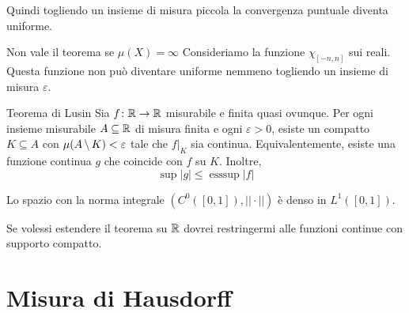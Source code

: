 \documentclass[a4paper]{article}
\begin{document}
\begin{radioactive}
Quindi togliendo un insieme di misura piccola la convergenza puntuale diventa uniforme.
\end{radioactive}

\begin{radioactive}
\begin{snippetexample}{Non vale il teorema se \(\mu(X) = \infty\)}
    Consideriamo la funzione \(\chi_{[-n,n]}\) sui reali.
    Questa funzione non può diventare uniforme nemmeno togliendo un insieme di misura \(\varepsilon\).
\end{snippetexample}
\end{radioactive}

\begin{radioactive}
\begin{snippettheorem}{Teorema di Lusin}
    Sia \(f\colon\mathbb{R}\to\mathbb{R}\) misurabile e finita quasi ovunque.
    Per ogni insieme misurabile \(A\subseteq\mathbb{R}\) di misura finita e ogni \(\varepsilon>0\),
    esiste un compatto \(K\subseteq A\) con \(\mu(A\,\backslash\, K)<\varepsilon\) tale che
    \(f|_K\) sia continua. Equivalentemente, esiste una funzione continua \(g\) che coincide con \(f\)
    su \(K\).
    Inoltre, \[
        \sup|g| \leq \operatorname{ess sup}|f|
    \]
\end{snippettheorem}
\end{radioactive}

\begin{radioactive}
\begin{snippetcorollary}{}
    Lo spazio con la norma integrale \((C^0([0,1]), ||\cdot||)\) è denso in
    \(L^1([0,1])\).
\end{snippetcorollary}
\end{radioactive}

\begin{radioactive}
Se volessi estendere il teorema su \(\mathbb{R}\) dovrei restringermi
alle funzioni continue con supporto compatto.
\end{radioactive}

\section{Misura di Hausdorff}
\end{document}
